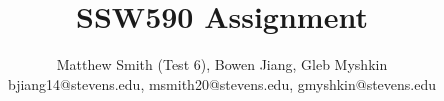 %

\begin{titlepage}
        \title{SSW590 Assignment}
        \author{Matthew Smith (Test 6), Bowen Jiang, Gleb Myshkin \\bjiang14@stevens.edu, msmith20@stevens.edu, gmyshkin@stevens.edu }
        \conferraldate{}{\today} \maketitle

        \vspace{1em}
        \begin{center}
            {\large \VERSION}
        \end{center}

\end{titlepage}

\makecopyright

\begin{abstract}
\end{abstract}


% 


\begingroup
  \hypersetup{linktoc=page}
  \contentspage
\endgroup

\begingroup
  \hypersetup{linktoc=page}
  \tablelistpage
\endgroup

\begingroup
  \hypersetup{linktoc=page}
  \figurelistpage
\endgroup
